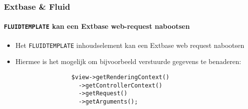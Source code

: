 \begin{frame}[fragile]
	\frametitle{Extbase \& Fluid}
	\framesubtitle{\texttt{FLUIDTEMPLATE} kan een Extbase web-request nabootsen}

	\lstset{basicstyle=\small\ttfamily}

	\begin{itemize}
		\item Het \texttt{FLUIDTEMPLATE} inhoudselement kan een Extbase web request nabootsen
		\item Hiermee is het mogelijk om bijvoorbeeld verstuurde gegevens te benaderen:

			\begin{lstlisting}
				$view->getRenderingContext()
				  ->getControllerContext()
				  ->getRequest()
				  ->getArguments();
			\end{lstlisting}

	\end{itemize}

\end{frame}





